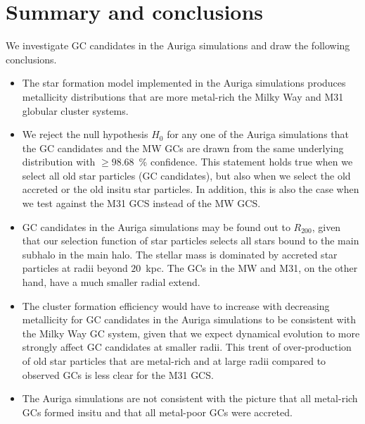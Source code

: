 \documentclass[a4paper,fleqn,usenatbib]{mnras}
\begin{document}
\section{Summary and conclusions}
\label{sec:conclusions}

We investigate GC candidates in the Auriga simulations and draw the following
conclusions.

 \begin{itemize} 
    \item The star formation model implemented in the Auriga simulations produces
    metallicity distributions that are more metal-rich the Milky Way and M31
    globular cluster systems.

    \item We reject the null hypothesis $H_0$ for any one of the Auriga simulations 
    that the GC candidates and the MW GCs are drawn from the same underlying 
    distribution with $\geq 98.68$~\% confidence. This statement holds true when
    we select all old star particles (GC candidates), but also when we select the 
    old accreted or the old insitu star particles. In addition, this is also
    the case when we test against the M31 GCS instead of the MW GCS.

    \item GC candidates in the Auriga simulations may be found out to $R_{200}$,
    given that our selection function of star particles selects all stars bound
    to the main subhalo in the main halo. The stellar mass is dominated by accreted 
    star particles at radii beyond $20$~kpc. The GCs in the MW and M31, on the 
    other hand, have a much smaller radial extend.

    \item The cluster formation efficiency would have to increase with decreasing
    metallicity for GC candidates in the Auriga simulations to be consistent
    with the Milky Way GC system, given that we expect dynamical evolution to 
    more strongly affect GC candidates at smaller radii. This trent of over-production
    of old star particles that are metal-rich and at large radii compared to 
    observed GCs is less clear for the M31 GCS.

    \item The Auriga simulations are not consistent with the picture that all
    metal-rich GCs formed insitu and that all metal-poor GCs were accreted.

 \end{itemize} 
\end{document}
